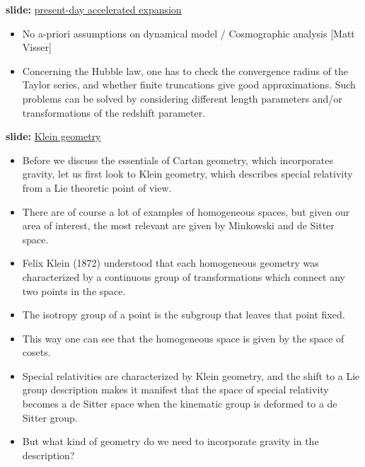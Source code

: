 \documentclass[10pt,a4paper]{article}
\begin{document}
\noindent
\textbf{slide:} \underline{present-day accelerated expansion}

\begin{itemize}
  \item No a-priori assumptions on dynamical model / Cosmographic 
    analysis [Matt Visser]
  \item Concerning the Hubble law, one has to check the 
    convergence radius of the Taylor series, and whether finite 
    truncations give good approximations. Such problems can be 
    solved by considering different length parameters and/or 
    transformations of the redshift parameter.
\end{itemize}

\noindent
\textbf{slide:} \underline{Klein geometry}

\begin{itemize}
  \item Before we discuss the essentials of Cartan geometry, 
    which incorporates gravity, let us first look to Klein 
    geometry, which describes special relativity from a Lie 
    theoretic point of view.
  \item There are of course a lot of examples of homogeneous 
    spaces, but given our area of interest, the most relevant are 
    given by Minkowski and de Sitter space.
  \item Felix Klein (1872) understood that each homogeneous 
    geometry was characterized by a continuous group of 
    transformations which connect any two points in the space.
  \item The isotropy group of a point is the subgroup that leaves 
    that point fixed.
  \item This way one can see that the homogeneous space is given 
    by the space of cosets.
  \item Special relativities are characterized by Klein geometry, 
    and the shift to a Lie group description makes it manifest 
    that the space of special relativity becomes a de Sitter 
    space when the kinematic group is deformed to a de Sitter 
    group.
  \item But what kind of geometry do we need to incorporate 
    gravity in the description?
\end{itemize}
\end{document}
